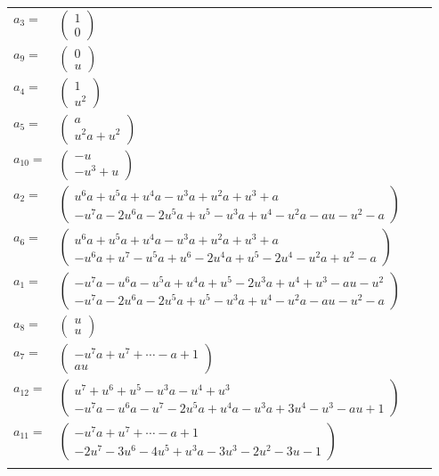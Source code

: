 \documentclass[1p]{elsarticle_modified}
\theoremstyle{definition}
\begin{document}
\begin{tabular}{m{7pt} m{180pt} m{7pt} m{180pt} }
\flushright $a_{3}=$&$\begin{pmatrix}1\\0\end{pmatrix}$ \\
\flushright $a_{9}=$&$\begin{pmatrix}0\\u\end{pmatrix}$ \\
\flushright $a_{4}=$&$\begin{pmatrix}1\\u^2\end{pmatrix}$ \\
\flushright $a_{5}=$&$\begin{pmatrix}a\\u^2 a+u^2\end{pmatrix}$ \\
\flushright $a_{10}=$&$\begin{pmatrix}- u\\- u^3+u\end{pmatrix}$ \\
\flushright $a_{2}=$&$\begin{pmatrix}u^6 a+u^5 a+u^4 a- u^3 a+u^2 a+u^3+a\\- u^7 a-2 u^6 a-2 u^5 a+u^5- u^3 a+u^4- u^2 a- a u- u^2- a\end{pmatrix}$ \\
\flushright $a_{6}=$&$\begin{pmatrix}u^6 a+u^5 a+u^4 a- u^3 a+u^2 a+u^3+a\\- u^6 a+u^7- u^5 a+u^6-2 u^4 a+u^5-2 u^4- u^2 a+u^2- a\end{pmatrix}$ \\
\flushright $a_{1}=$&$\begin{pmatrix}- u^7 a- u^6 a- u^5 a+u^4 a+u^5-2 u^3 a+u^4+u^3- a u- u^2\\- u^7 a-2 u^6 a-2 u^5 a+u^5- u^3 a+u^4- u^2 a- a u- u^2- a\end{pmatrix}$ \\
\flushright $a_{8}=$&$\begin{pmatrix}u\\u\end{pmatrix}$ \\
\flushright $a_{7}=$&$\begin{pmatrix}- u^7 a+u^7+\cdots- a+1\\a u\end{pmatrix}$ \\
\flushright $a_{12}=$&$\begin{pmatrix}u^7+u^6+u^5- u^3 a- u^4+u^3\\- u^7 a- u^6 a- u^7-2 u^5 a+u^4 a- u^3 a+3 u^4- u^3- a u+1\end{pmatrix}$ \\
\flushright $a_{11}=$&$\begin{pmatrix}- u^7 a+u^7+\cdots- a+1\\-2 u^7-3 u^6-4 u^5+u^3 a-3 u^3-2 u^2-3 u-1\end{pmatrix}$\\&\end{tabular}
\end{document}
